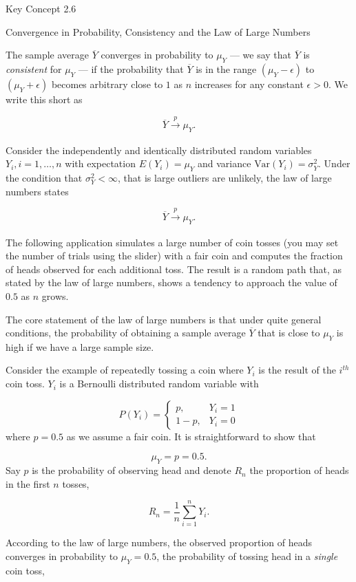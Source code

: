 \documentclass[]{book}
\theoremstyle{definition}
\theoremstyle{definition}
\theoremstyle{definition}
\theoremstyle{remark}
\begin{document}
Key Concept 2.6

Convergence in Probability, Consistency and the Law of Large Numbers

The sample average \(\overline{Y}\) converges in probability to
\(\mu_Y\) --- we say that \(\overline{Y}\) is \emph{consistent} for
\(\mu_Y\) --- if the probability that \(\overline{Y}\) is in the range
\((\mu_Y - \epsilon)\) to \((\mu_Y + \epsilon)\) becomes arbitrary close
to \(1\) as \(n\) increases for any constant \(\epsilon > 0\). We write
this short as

\[ \overline{Y} \xrightarrow[]{p} \mu_Y. \]

Consider the independently and identically distributed random variables
\(Y_i, i=1,\dots,n\) with expectation \(E(Y_i)=\mu_Y\) and variance
\(\text{Var}(Y_i)=\sigma^2_Y\). Under the condition that
\(\sigma^2_Y< \infty\), that is large outliers are unlikely, the law of
large numbers states

\[ \overline{Y} \xrightarrow[]{p} \mu_Y. \]

The following application simulates a large number of coin tosses (you
may set the number of trials using the slider) with a fair coin and
computes the fraction of heads observed for each additional toss. The
result is a random path that, as stated by the law of large numbers,
shows a tendency to approach the value of \(0.5\) as \(n\) grows.

The core statement of the law of large numbers is that under quite
general conditions, the probability of obtaining a sample average
\(\overline{Y}\) that is close to \(\mu_Y\) is high if we have a large
sample size.

Consider the example of repeatedly tossing a coin where \(Y_i\) is the
result of the \(i^{th}\) coin toss. \(Y_i\) is a Bernoulli distributed
random variable with

\[ P(Y_i) = \begin{cases} p, & Y_i = 1 \\ 1-p, & Y_i = 0 \end{cases} \]
where \(p = 0.5\) as we assume a fair coin. It is straightforward to
show that

\[ \mu_Y = p = 0.5. \] Say \(p\) is the probability of observing head
and denote \(R_n\) the proportion of heads in the first \(n\) tosses,

\[ R_n = \frac{1}{n} \sum_{i=1}^n Y_i. \tag{2.5}\]

According to the law of large numbers, the observed proportion of heads
converges in probability to \(\mu_Y = 0.5\), the probability of tossing
head in a \emph{single} coin toss,
\end{document}
